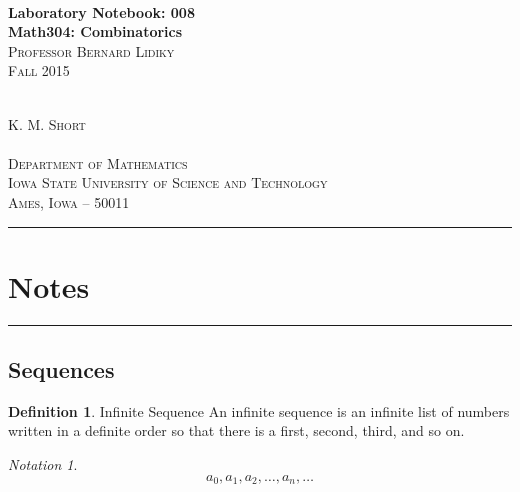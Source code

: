 \documentclass[10pt,a4paper,titlepage,twoside,draft]{article}
\theoremstyle{plain}
\theoremstyle{definition}
\newtheorem{defn}{Definition}
\theoremstyle{remark}
\newtheorem{nota}{Notation}
\begin{document}
\begin{titlepage}
\thispagestyle{empty}
\begin{center}
\hrulefill \\[0.02in]
\Large \textbf{Laboratory Notebook: 008} \\[0.05in]
\large \textbf{Math304: Combinatorics} \\[0.05in]
\normalsize \textsc{Professor Bernard Lidiky}\\[0.05in]
\small \textsc{Fall 2015} \\[0.05in]
\hrulefill \\
\vspace{05.0in}

\normalsize{\textsc{K. M. Short} } \\[0.02in]
\hrulefill \\[0.05in]
\normalsize \textsc{Department of Mathematics}\\[0.05in]
\normalsize \textsc{Iowa State University of Science and Technology}\\ [0.05in]
\small \textsc{Ames, Iowa -- 50011} \\[0.05in]
\end{center}

\end{titlepage}



\pagebreak

\tableofcontents

\pagebreak

\listoffigures

\pagebreak

\listoftables

\pagebreak

\hrule
\section{Notes}
\hrule
\vfill
\pagebreak


\subsection{Sequences}

\begin{defn}{Infinite Sequence}
An infinite sequence is an infinite list of numbers written in a definite order so that there is a first, second, third, and so on.
\end{defn}

\smallskip

\begin{nota}
\[ a_{0}, a_{1}, a_{2}, \ldots, a_{n}, \ldots \]
\end{nota}
\end{document}

